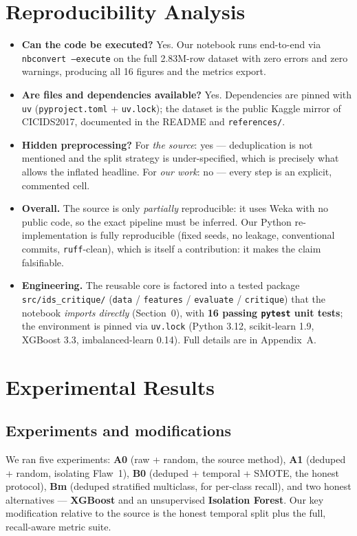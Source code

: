 \documentclass[11pt,a4paper]{article}
\begin{document}
\section{Reproducibility Analysis}
\begin{itemize}[leftmargin=1.4em,itemsep=2pt]
\item \textbf{Can the code be executed?} Yes. Our notebook runs end-to-end via
\texttt{nbconvert --execute} on the full 2.83M-row dataset with zero errors and zero warnings,
producing all 16 figures and the metrics export.
\item \textbf{Are files and dependencies available?} Yes. Dependencies are pinned with
\texttt{uv} (\texttt{pyproject.toml} + \texttt{uv.lock}); the dataset is the public Kaggle
mirror of CICIDS2017, documented in the README and \texttt{references/}.
\item \textbf{Hidden preprocessing?} For \emph{the source}: yes --- deduplication is not
mentioned and the split strategy is under-specified, which is precisely what allows the
inflated headline. For \emph{our work}: no --- every step is an explicit, commented cell.
\item \textbf{Overall.} The source is only \emph{partially} reproducible: it uses Weka with no
public code, so the exact pipeline must be inferred. Our Python re-implementation is fully
reproducible (fixed seeds, no leakage, conventional commits, \texttt{ruff}-clean), which is
itself a contribution: it makes the claim falsifiable.
\item \textbf{Engineering.} The reusable core is factored into a tested package
\texttt{src/ids\_critique/} (\texttt{data} / \texttt{features} / \texttt{evaluate} /
\texttt{critique}) that the notebook \emph{imports directly} (Section~0), with \textbf{16 passing
\texttt{pytest} unit tests}; the environment is pinned via \texttt{uv.lock} (Python 3.12,
scikit-learn 1.9, XGBoost 3.3, imbalanced-learn 0.14). Full details are in Appendix~A.
\end{itemize}

\section{Experimental Results}
\subsection{Experiments and modifications}
We ran five experiments: \textbf{A0} (raw + random, the source method), \textbf{A1}
(deduped + random, isolating Flaw~1), \textbf{B0} (deduped + temporal + SMOTE, the honest
protocol), \textbf{Bm} (deduped stratified multiclass, for per-class recall), and two honest
alternatives --- \textbf{XGBoost} and an unsupervised \textbf{Isolation Forest}. Our key
modification relative to the source is the honest temporal split plus the full,
recall-aware metric suite.
\end{document}
